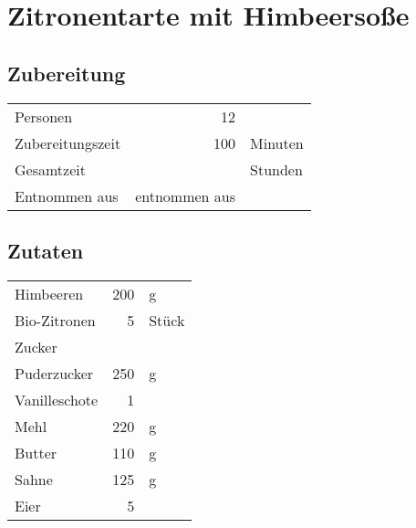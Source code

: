 \section{Zitronentarte mit Himbeersoße} 
\subsection*{Zubereitung}
\begin{tabular}{lrl}
	Personen         &                12 &  \\
	Zubereitungszeit &               100 & Minuten \\
	Gesamtzeit       &                   & Stunden \\
	Entnommen aus    & entnommen aus \cite{Oliver2009} &
\end{tabular} 

\subsection*{Zutaten}
\begin{tabular}{lrl}
	Himbeeren     & 200 &     g \\
	Bio-Zitronen  &   5 & Stück \\
	Zucker        &     &  \\
	Puderzucker   & 250 &     g \\
	Vanilleschote &   1 &  \\
	Mehl          & 220 &     g \\
	Butter        & 110 &     g \\
	Sahne         & 125 &     g \\
	Eier          &   5 &
\end{tabular} 


